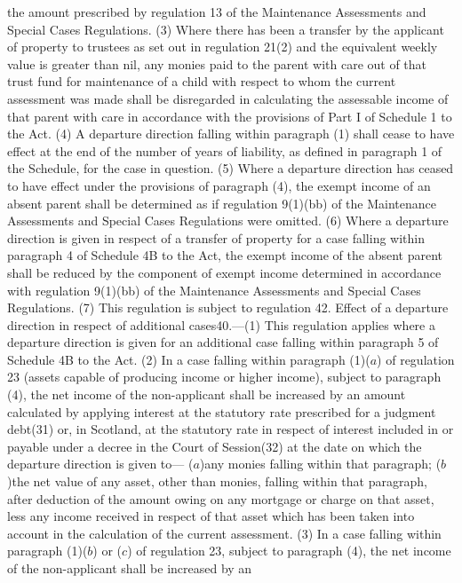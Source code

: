 \documentclass[a4paper]{article}
\begin{document}
the amount prescribed by regulation 13 of the Maintenance Assessments and
Special Cases Regulations.
(3) Where there has been a transfer by the applicant of property to trustees as
set out in regulation 21(2) and the equivalent weekly value is greater than nil,
any monies paid to the parent with care out of that trust fund for maintenance
of a child with respect to whom the current assessment was made shall be
disregarded in calculating the assessable income of that parent with care in
accordance with the provisions of Part I of Schedule 1 to the Act.
(4) A departure direction falling within paragraph (1) shall cease to have
effect at the end of the number of years of liability, as defined in paragraph 1
of the Schedule, for the case in question.
(5) Where a departure direction has ceased to have effect under the provisions
of paragraph (4), the exempt income of an absent parent shall be determined as
if regulation 9(1)(bb) of the Maintenance Assessments and Special Cases
Regulations were omitted.
(6) Where a departure direction is given in respect of a transfer of property
for a case falling within paragraph 4 of Schedule 4B to the Act, the exempt
income of the absent parent shall be reduced by the component of exempt income
determined in accordance with regulation 9(1)(bb) of the Maintenance Assessments
and Special Cases Regulations.
(7) This regulation is subject to regulation 42.
Effect of a departure direction in respect of additional cases40.—(1) This
regulation applies where a departure direction is given for an additional case
falling within paragraph 5 of Schedule 4B to the Act.
(2) In a case falling within paragraph (1)($a$) of regulation 23 (assets capable
of producing income or higher income), subject to paragraph (4), the net income
of the non-applicant shall be increased by an amount calculated by applying
interest at the statutory rate prescribed for a judgment debt(31) or, in
Scotland, at the statutory rate in respect of interest included in or payable
under a decree in the Court of Session(32) at the date on which the departure
direction is given to—
($a$)any monies falling within that paragraph;
($b$)the net value of any asset, other than monies, falling within that paragraph,
after deduction of the amount owing on any mortgage or charge on that asset,
less any income received in respect of that asset which has been taken into
account in the calculation of the current assessment.
(3) In a case falling within paragraph (1)($b$) or ($c$) of regulation 23, subject
to paragraph (4), the net income of the non-applicant shall be increased by an
\end{document}
